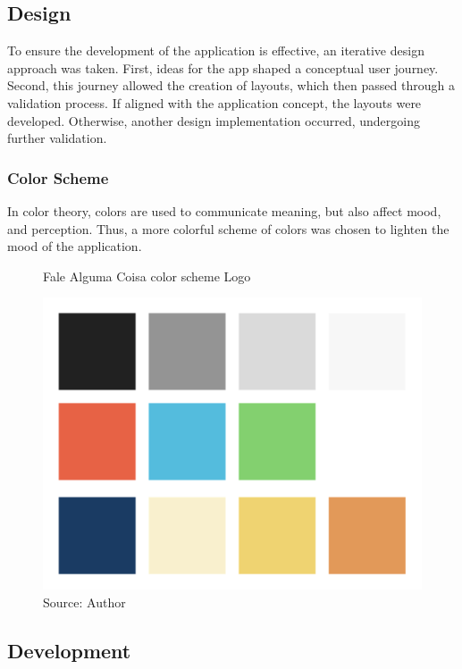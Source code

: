 \subsection{Design}

To ensure the development of the application is effective, an iterative design approach was taken. First, ideas for the app shaped a conceptual user journey. Second, this journey allowed the creation of layouts, which then passed through a validation process. If aligned with the application concept, the layouts were developed. Otherwise, another design implementation occurred, undergoing further validation.

\subsubsection{Color Scheme}

In color theory, colors are used to communicate meaning, but also affect mood, and perception. Thus, a more colorful scheme of colors was chosen to lighten the mood of the application.

\begin{figure}[ht]
    \centering
    \caption{Fale Alguma Coisa color scheme Logo}
    \includegraphics[width=\linewidth/2]{images/app/colors.png}
    \caption*{Source: Author}
    \label{fig:foldit-solution}
\end{figure}

\subsection{Development}

